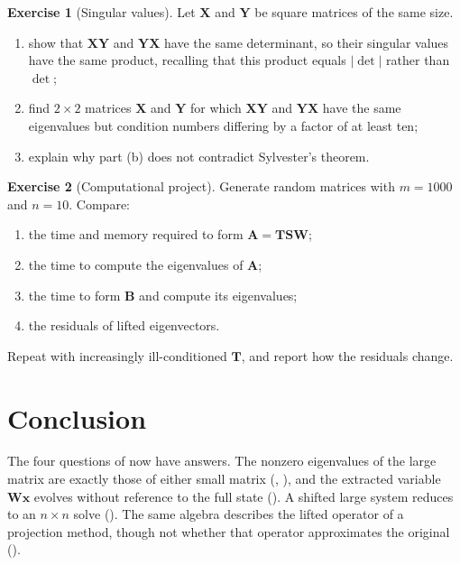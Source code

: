 \documentclass[11pt]{article}
\newcommand{\mat}[1]{\mathbf{#1}}
\newcommand{\vect}[1]{\mathbf{#1}}
\theoremstyle{definition}
\newtheorem{exercise}{Exercise}[section]
\theoremstyle{remark}
\begin{document}
\begin{exercise}[Singular values]
\label{ex:singular-values}
Let \(\mat{X}\) and \(\mat{Y}\) be square matrices of the same size.
\begin{enumerate}[label=(\alph*)]
  \item show that \(\mat{X}\mat{Y}\) and \(\mat{Y}\mat{X}\) have the same determinant, so their singular values have the same product, recalling that this product equals \(\lvert\det\rvert\) rather than \(\det\);
  \item find \(2\times2\) matrices \(\mat{X}\) and \(\mat{Y}\) for which \(\mat{X}\mat{Y}\) and \(\mat{Y}\mat{X}\) have the same eigenvalues but condition numbers differing by a factor of at least ten;
  \item explain why part (b) does not contradict Sylvester's theorem.
\end{enumerate}
\end{exercise}

\begin{exercise}[Computational project]
\label{ex:computational-project}
Generate random matrices with \(m=1000\) and \(n=10\). Compare:
\begin{enumerate}[label=(\alph*)]
  \item the time and memory required to form \(\mat{A}=\mat{T}\mat{S}\mat{W}\);
  \item the time to compute the eigenvalues of \(\mat{A}\);
  \item the time to form \(\mat{B}\) and compute its eigenvalues;
  \item the residuals of lifted eigenvectors.
\end{enumerate}
Repeat with increasingly ill-conditioned \(\mat{T}\), and report how the residuals change.
\end{exercise}

\section{Conclusion}
\label{sec:conclusion}

The four questions of  now have answers. The nonzero eigenvalues of the large matrix are exactly those of either small matrix (, ), and the extracted variable \(\mat{W}\vect{x}\) evolves without reference to the full state (). A shifted large system reduces to an \(n\times n\) solve (). The same algebra describes the lifted operator of a projection method, though not whether that operator approximates the original ().
\end{document}
